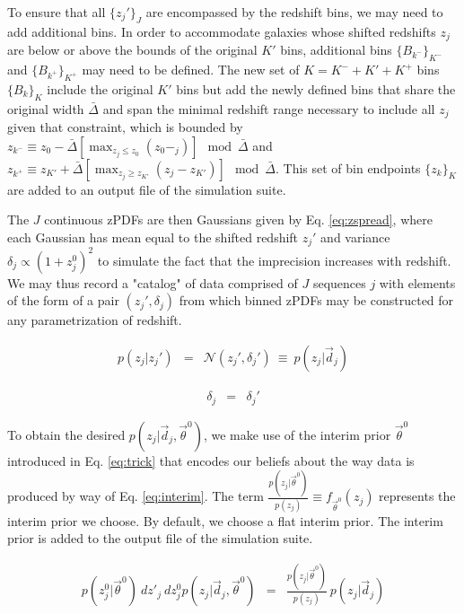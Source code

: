 \documentclass[preprint]{aastex}
\begin{document}
To ensure that all $\{z_{j}'\}_{J}$ are encompassed by the redshift bins, we 
may need to add additional bins.  In order to accommodate galaxies whose 
shifted redshifts $z_{j}$ are below or above the bounds of the original $K'$ 
bins, additional bins $\{B_{k^{-}}\}_{K^{-}}$ and $\{B_{k^{+}}\}_{K^{+}}$ may 
need to be defined.  The new set of $K=K^{-}+K'+K^{+}$ bins $\{B_{k}\}_{K}$ 
include the original $K'$ bins but add the newly defined bins that share the 
original width $\bar{\Delta}$ and span the minimal redshift range necessary to 
include all $z_{j}$ given that constraint, which is bounded by $z_{k^{-}}\equiv 
z_{0}-\bar{\Delta}[\max_{z_{j}\leq z_{0}}(z_{0}-_{j})]\mod\bar{\Delta}$ and 
$z_{k^{+}}\equiv z_{K'}+\bar{\Delta}[\max_{z_{j}\geq 
z_{K'}}(z_{j}-z_{K'})]\mod\bar{\Delta}$.  This set of bin endpoints 
$\{z_{k}\}_{K}$ are added to an output file of the simulation suite.

The $J$ continuous zPDFs are then Gaussians given by Eq. \ref{eq:zspread}, 
where each Gaussian has mean equal to the shifted redshift $z_{j}'$ and 
variance $\delta_{j}\propto(1+z_{j}^{0})^{2}$ to simulate the fact that the 
imprecision increases with redshift.  We may thus record a "catalog" of data 
comprised of $J$ sequences $j$ with elements of the form of a pair 
$(z_{j}',\delta_{j})$ from which binned zPDFs may be constructed for any 
parametrization of redshift.  

\begin{eqnarray}
\label{eq:zspread}
p(z_{j}|z_{j}') &=& \mathcal{N}(z_{j}',\delta_{j}')\ \equiv\ 
p(z_{j}|\vec{d}_{j})
\end{eqnarray}

\begin{eqnarray}
\label{eq:delta-spread}
\delta_{j} &=& \delta_{j}'
\end{eqnarray}

To obtain the desired $p(z_{j}|\vec{d}_{j},\vec{\theta}^{0})$, we make use of 
the interim prior $\vec{\theta}^{0}$ introduced in Eq. \ref{eq:trick} that 
encodes our beliefs about the way data is produced by way of Eq. 
\ref{eq:interim}.  The term $\frac{p(z_{j}|\vec{\theta}^{0})}{p(z_{j})}\equiv 
f_{\vec{\theta}^{0}}(z_{j})$ represents the interim prior we choose.  By 
default, we choose a flat interim prior.  The interim prior is added to the 
output file of the simulation suite.  

\begin{eqnarray}
\label{eq:interim}
p(z^{0}_{j}|\vec{\theta}^{0})\ dz'_{j}\ dz^{0}_{j}
p(z_{j}|\vec{d}_{j},\vec{\theta}^{0}) &=& 
\frac{p(z_{j}|\vec{\theta}^{0})}{p(z_{j})}\ p(z_{j}|\vec{d}_{j})
\end{eqnarray}
\end{document}
